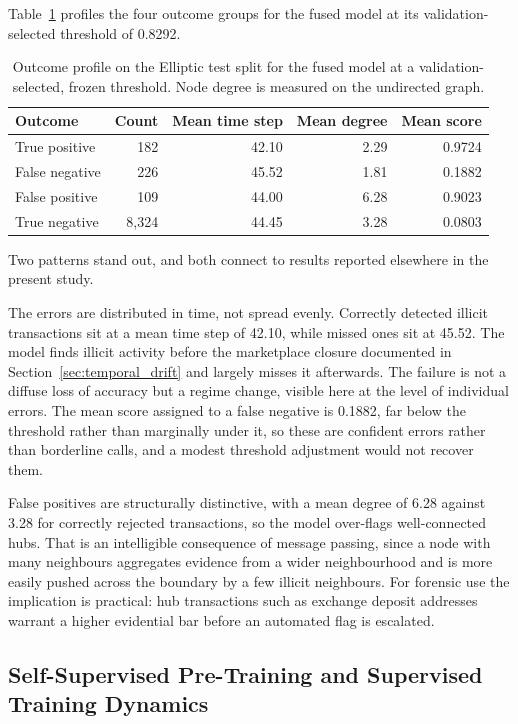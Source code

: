 \documentclass[12pt,a4paper]{article}
\begin{document}
Table~\ref{tab:error_profile} profiles the four outcome groups
for the fused model at its validation-selected threshold of
0.8292.

\begin{table}[htbp]
\centering
\small
\caption{Outcome profile on the Elliptic test split for the fused
model at a validation-selected, frozen threshold. Node degree is
measured on the undirected graph.}
\label{tab:error_profile}
\begin{tabular}{lrrrr}
\toprule
Outcome & Count & Mean time step & Mean degree & Mean score \\
\midrule
True positive  &   182 & 42.10 & 2.29 & 0.9724 \\
False negative &   226 & 45.52 & 1.81 & 0.1882 \\
False positive &   109 & 44.00 & 6.28 & 0.9023 \\
True negative  & 8{,}324 & 44.45 & 3.28 & 0.0803 \\
\bottomrule
\end{tabular}
\end{table}

Two patterns stand out, and both connect to results reported
elsewhere in the present study.

The errors are distributed in time, not spread evenly. Correctly
detected illicit transactions sit at a mean time step of 42.10,
while missed ones sit at 45.52. The model finds illicit activity
before the marketplace closure documented in
Section~\ref{sec:temporal_drift} and largely misses it
afterwards. The failure is not a diffuse loss of accuracy but a
regime change, visible here at the level of individual errors.
The mean score assigned to a false negative is 0.1882, far below
the threshold rather than marginally under it, so these are
confident errors rather than borderline calls, and a modest
threshold adjustment would not recover them.

False positives are structurally distinctive, with a mean degree
of 6.28 against 3.28 for correctly rejected transactions, so the
model over-flags well-connected hubs. That is an intelligible
consequence of message passing, since a node with many
neighbours aggregates evidence from a wider neighbourhood and is
more easily pushed across the boundary by a few illicit
neighbours. For forensic use the implication is practical: hub
transactions such as exchange deposit addresses warrant a higher
evidential bar before an automated flag is escalated.

\subsection{Self-Supervised Pre-Training and Supervised Training Dynamics}
\end{document}
